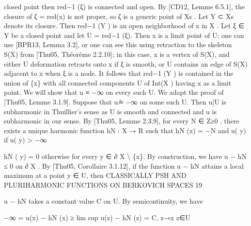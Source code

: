 \documentclass[
  10pt,
]{article}
\newenvironment{Shaded}{}{}
\newcommand{\NormalTok}[1]{#1}
\begin{document}
\begin{Shaded}
\begin{Highlighting}[]
\NormalTok{closed point then red−1 (ξ) is connected and open.}
\NormalTok{   By [CD12, Lemme 6.5.1], the closure of ζ = red(x) is not proper, so ζ is a generic}
\NormalTok{point of Xs . Let Y ⊂ Xs denote its closure. Then red−1 (Y ) is an open neighborhood of}
\NormalTok{x in X . Let ξ ∈ Y be a closed point and let U = red−1 (ξ). Then x is a limit point of U:}
\NormalTok{one can use [BPR13, Lemma 3.2], or one can see this using retraction to the skeleton}
\NormalTok{S(X) from [Thu05, Théorème 2.2.10]; in this case, x is a vertex of S(X), and either U}
\NormalTok{deformation retracts onto x if ξ is smooth, or U contains an edge of S(X) adjacent to}
\NormalTok{x when ξ is a node. It follows that red−1 (Y ) is contained in the union of \{x\} with all}
\NormalTok{connected components U of Int(X ) having x as a limit point. We will show that u ≡ −∞}
\NormalTok{on every such U.}
\NormalTok{   We adapt the proof of [Thu05, Lemme 3.1.9]. Suppose that u ̸≡ −∞ on some such}
\NormalTok{U. Then u|U is subharmonic in Thuillier’s sense as U is smooth and connected and u is}
\NormalTok{subharmonic in our sense. By [Thu05, Lemme 2.3.9], for every N ∈ Z≥0 , there exists a}
\NormalTok{unique harmonic function hN : X → R such that hN (x) = −N and}
\NormalTok{                                           u( y) if u( y) \textgreater{} −∞}
                                         
\NormalTok{                               hN ( y) =}
\NormalTok{                                           0        otherwise}
\NormalTok{for every y ∈ ∂ X \textbackslash{} \{x\}. By construction, we have u − hN ≤ 0 on ∂ X . By [Thu05,}
\NormalTok{Corollaire 3.1.12], if the function u − hN attains a local maximum at a point y ∈ U, then}
\NormalTok{              CLASSICALLY PSH AND PLURIHARMONIC FUNCTIONS ON BERKOVICH SPACES                       19}

\NormalTok{u − hN takes a constant value C on U. By semicontinuity, we have}
                                                             
\NormalTok{                   −∞ = u(x) − hN (x) ≥ lim sup u(z) − hN (z) = C,}
\NormalTok{                                                   z→x}
\NormalTok{                                                   z∈U}


\end{Highlighting}
\end{Shaded}
\end{document}
